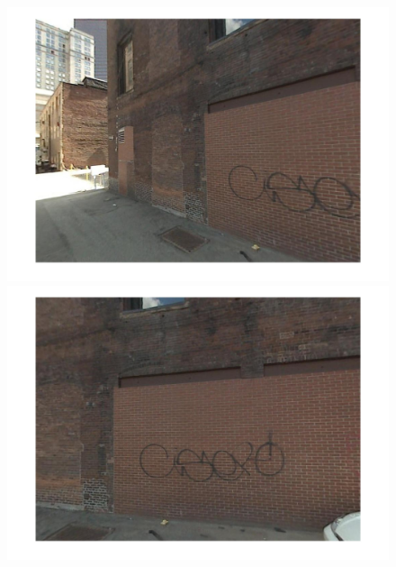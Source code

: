 \begin{figure}[!ht]
{	 }
	 \colorbox{myGreen}{
		\begin{minipage}{\subw}
		  \centerline{
		  \includegraphics[width=1.05\linewidth]{imgs/aggrv/05aggrvK.jpg}
		  }
		\end{minipage}
	 }
	 \colorbox{myGreen}{
		\begin{minipage}{\subw}
		  \centerline{
		  \includegraphics[width=1.05\linewidth]{imgs/aggrv/05aggrvB.jpg}
		  }
		\end{minipage}
	 }
	 \vspace{1mm}
	 \\
	 \colorbox{gray}{
		\begin{minipage}{\subw}
		  \centerline{
}
\end{minipage}}
\end{figure}
